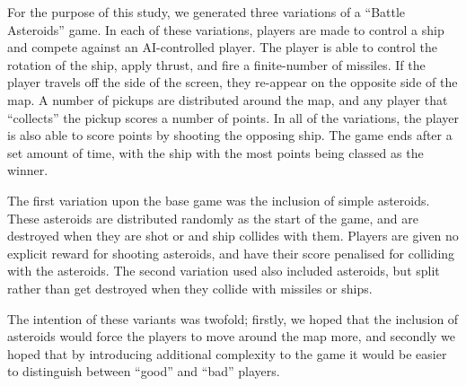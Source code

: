 For the purpose of this study, we generated three variations of a “Battle Asteroids” game. In each of these variations, players are made to control a ship and compete against an AI-controlled player. The player is able to control the rotation of the ship, apply thrust, and fire a finite-number of missiles. If the player travels off the side of the screen, they re-appear on the opposite side of the map. A number of pickups are distributed around the map, and any player that “collects” the pickup scores a number of points. In all of the variations, the player is also able to score points by shooting the opposing ship. The game ends after a set amount of time, with the ship with the most points being classed as the winner.

The first variation upon the base game was the inclusion of simple asteroids. These asteroids are distributed randomly as the start of the game, and are destroyed when they are shot or and ship collides with them. Players are given no explicit reward for shooting asteroids, and have their score penalised for colliding with the asteroids. The second variation used also included asteroids, but split rather than get destroyed when they collide with missiles or ships.

The intention of these variants was twofold; firstly, we hoped that the inclusion of asteroids would force the players to move around the map more, and secondly we hoped that by introducing additional complexity to the game it would be easier to distinguish between “good” and “bad” players.